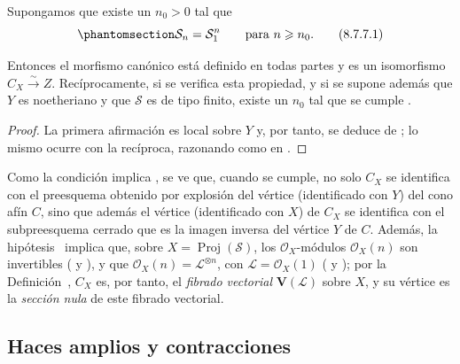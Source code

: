 \documentclass[oneside,10pt]{amsart}
\let\EGAOriginalLabel\label
\renewcommand{\label}[1]{\phantomsection\EGAOriginalLabel{#1}}
\begin{document}
\begin{corollary}[8.7.7]
\label{II.8.7.7-fr}
Supongamos que existe un $n_0>0$ tal que
\begin{equation}
\label{II.8.7.7.1-fr}
  \mathcal{S}_n=\mathcal{S}_1^n
  \qquad\text{para }n\geqslant n_0.
\tag{8.7.7.1}
\end{equation}

Entonces el morfismo canónico  está definido en todas partes y es un isomorfismo $C_X\xrightarrow{\sim}Z$.
Recíprocamente, si se verifica esta propiedad, y si se supone además que $Y$ es noetheriano y que $\mathcal{S}$ es de tipo finito, existe un $n_0$ tal que se cumple .
\end{corollary}

\begin{proof}
La primera afirmación es local sobre $Y$ y, por tanto, se deduce de ;
lo mismo ocurre con la recíproca, razonando como en .
\end{proof}
\begin{remark}[8.7.8]
\label{II.8.7.8-fr}
Como la condición  implica , se ve que, cuando se cumple, no solo $C_X$ se identifica con el preesquema obtenido por explosión del vértice (identificado con $Y$) del cono afín $C$, sino que además el vértice (identificado con $X$) de $C_X$ se identifica con el subpreesquema cerrado que es la imagen inversa del vértice $Y$ de $C$.
Además, la hipótesis~ implica que, sobre $X=\operatorname{Proj}(\mathcal{S})$, los $\mathcal{O}_X$-módulos $\mathcal{O}_X(n)$ son invertibles ( y ), y que $\mathcal{O}_X(n)=\mathcal{L}^{\otimes n}$, con $\mathcal{L}=\mathcal{O}_X(1)$ ( y );
por la Definición~, $C_X$ es, por tanto, el \emph{fibrado vectorial} $\mathbf{V}(\mathcal{L})$ sobre $X$, y su vértice es la \emph{sección nula} de este fibrado vectorial.
\end{remark}
\subsection{Haces amplios y contracciones}
\label{subsection:II.8.8-fr}
\end{document}
